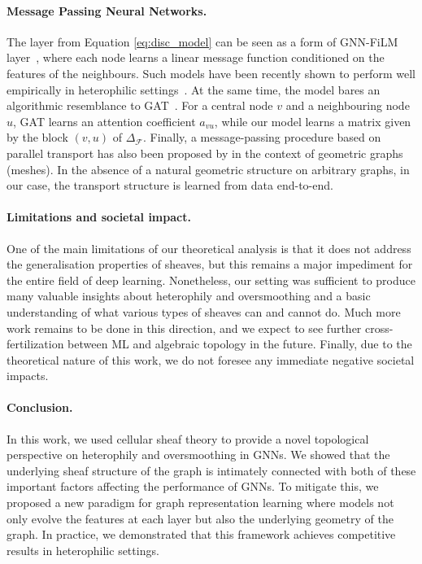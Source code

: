 \documentclass{article}
\def\gF{{\mathcal{F}}}
\begin{document}
\paragraph{Message Passing Neural Networks.} The layer from Equation \ref{eq:disc_model} can be seen as a form of GNN-FiLM layer~\citep{brockschmidt2020gnn, perez2018film}, where each node learns a linear message function conditioned on the features of the neighbours. Such models have been recently shown to perform well empirically in heterophilic settings~\citep{palowitch2022graphworld}. At the same time, the model bares an algorithmic resemblance to GAT~\citep{velivckovic2017graph}. For a central node $v$ and a neighbouring node $u$, GAT learns an attention coefficient $a_{vu}$, while our model learns a matrix given by the block $(v, u)$ of $\Delta_\gF$. Finally, a message-passing procedure based on parallel transport has also been proposed by \citet{haan2021gauge} in the context of geometric graphs (meshes). In the absence of a natural geometric structure on arbitrary graphs, in our case, the transport structure is learned from data end-to-end.    

\paragraph{Limitations and societal impact.} One of the main limitations of our theoretical analysis is that it does not address the generalisation properties of sheaves, but this remains a major impediment for the entire field of deep learning. Nonetheless, our setting was sufficient to produce many valuable insights about heterophily and oversmoothing and a basic understanding of what various types of sheaves can and cannot do. Much more work remains to be done in this direction, and we expect to see further cross-fertilization between ML and algebraic topology in the future. Finally, due to the theoretical nature of this work, we do not foresee any immediate negative societal impacts.  


\paragraph{Conclusion.} In this work, we used cellular sheaf theory to provide a novel topological perspective on heterophily and oversmoothing in GNNs. We showed that the underlying sheaf structure of the graph is intimately connected with both of these important factors affecting the performance of GNNs. To mitigate this, we proposed a new paradigm for graph representation learning where models not only evolve the features at each layer but also the underlying geometry of the graph. In practice, we demonstrated that this framework achieves competitive results in heterophilic settings.  
\vspace{-7pt}
\end{document}

